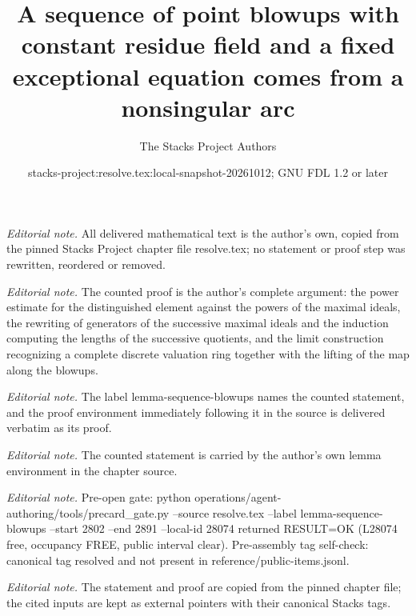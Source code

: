 \documentclass[10pt,a4paper]{amsart}
\title{A sequence of point blowups with constant residue field and a fixed exceptional equation comes from a nonsingular arc}
\author{The Stacks Project Authors}
\date{stacks-project:resolve.tex:local-snapshot-20261012; GNU FDL 1.2 or later}
\theoremstyle{plain}
\theoremstyle{definition}
\theoremstyle{remark}
\numberwithin{equation}{subsection}
\begin{document}
\maketitle
\noindent\textit{Editorial note.} All delivered mathematical text is the author's own, copied from the pinned Stacks Project chapter file resolve.tex; no statement or proof step was rewritten, reordered or removed.\par\medskip
\noindent\textit{Editorial note.} The counted proof is the author's complete argument: the power estimate for the distinguished element against the powers of the maximal ideals, the rewriting of generators of the successive maximal ideals and the induction computing the lengths of the successive quotients, and the limit construction recognizing a complete discrete valuation ring together with the lifting of the map along the blowups.\par\medskip
\noindent\textit{Editorial note.} The label lemma-sequence-blowups names the counted statement, and the proof environment immediately following it in the source is delivered verbatim as its proof.\par\medskip
\noindent\textit{Editorial note.} The counted statement is carried by the author's own lemma environment in the chapter source.\par\medskip
\noindent\textit{Editorial note.} Pre-open gate: python operations/agent-authoring/tools/precard\_gate.py --source resolve.tex --label lemma-sequence-blowups --start 2802 --end 2891 --local-id 28074 returned RESULT=OK (L28074 free, occupancy FREE, public interval clear). Pre-assembly tag self-check: canonical tag resolved and not present in reference/public-items.jsonl.\par\medskip
\noindent\textit{Editorial note.} The statement and proof are copied from the pinned chapter file; the cited inputs are kept as external pointers with their canonical Stacks tags.\par\medskip
\end{document}
